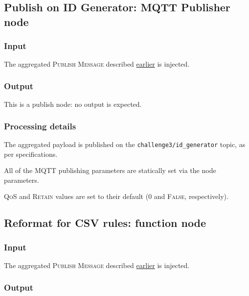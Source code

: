 \documentclass[a4paper,11pt]{article} %
\begin{document}
    \subsection{Publish on ID Generator: MQTT Publisher node}\label{subsec:publish-on-id-generator:-mqtt-publisher-node}

    \subsubsection{Input}

    The aggregated \textsc{Publish Message} described \hyperref[subsec:integrate-random-number:-function-node]{earlier} is injected.

    \subsubsection{Output}

    This is a publish node: no output is expected.

    \subsubsection{Processing details}

    The aggregated payload is published on the \texttt{challenge3/id\_generator} topic, as per specifications.

    \smallskip

    All of the MQTT publishing parameters are statically set via the node parameters.

    \smallskip

    \textsc{QoS} and \textsc{Retain} values are set to their default (\textsc{0} and \textsc{False}, respectively).

    \subsection{Reformat for CSV rules: function node}\label{subsec:reformat-for-csv-rules:-function-node}

    \subsubsection{Input}

    The aggregated \textsc{Publish Message} described \hyperref[subsec:integrate-random-number:-function-node]{earlier} is injected.

    \subsubsection{Output}
\end{document}
